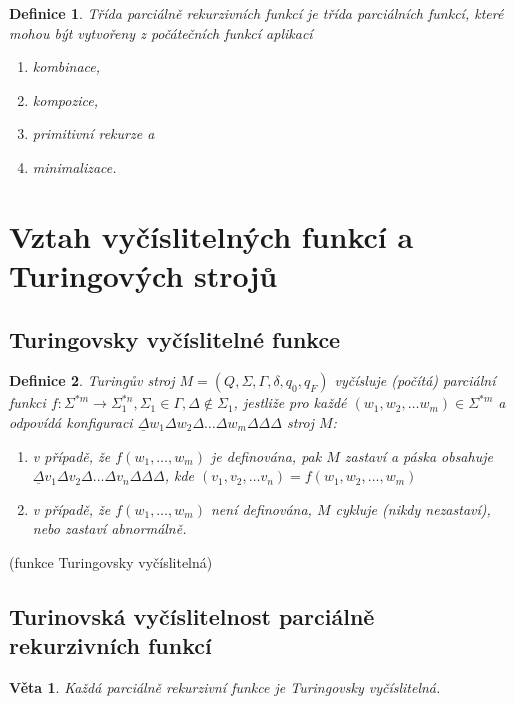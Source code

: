 \documentclass[a4paper, 11pt]{report}
\newtheorem{mydef}{Definice}[chapter]
\newtheorem{veta}{Věta}[chapter]
\begin{document}
\begin{mydef}
Třída parciálně rekurzivních funkcí je třída parciálních funkcí, které mohou být vytvořeny z počátečních funkcí aplikací
\begin{enumerate}
	\item kombinace,
	\item kompozice,
	\item primitivní rekurze a
	\item minimalizace.
\end{enumerate}
\end{mydef}

\section{Vztah vyčíslitelných funkcí a Turingových strojů}

\subsection{Turingovsky vyčíslitelné funkce}

\begin{mydef}
Turingův stroj $M=(Q, \Sigma, \Gamma, \delta, q_0, q_F)$ vyčísluje (počítá) parciální funkci $f: \Sigma^{*m} \to \Sigma_1^{*n}, \Sigma_1 \in \Gamma, \Delta \not\in \Sigma_1$, jestliže pro každé $(w_1, w_2, \dots w_m) \in \Sigma^{*m}$ a odpovídá konfiguraci $\underline{\Delta} w_1 \Delta w_2 \Delta \dots \Delta w_m \Delta \Delta \Delta$ stroj $M$:
\begin{enumerate}
	\item v případě, že $f(w_1, \dots, w_m)$ je definována, pak $M$ zastaví a páska obsahuje $\underline{\Delta} v_1 \Delta v_2 \Delta \dots \Delta v_n \Delta \Delta \Delta$, kde $(v_1, v_2, \dots v_n) = f(w_1, w_2, \dots, w_m)$
	\item v případě, že $f(w_1, \dots, w_m)$ není definována, $M$ cykluje (nikdy nezastaví), nebo zastaví abnormálně.
\end{enumerate}
\end{mydef}
(funkce Turingovsky vyčíslitelná)

\subsection{Turinovská vyčíslitelnost parciálně rekurzivních funkcí}

\begin{veta}
Každá parciálně rekurzivní funkce je Turingovsky vyčíslitelná.
\end{veta}
\end{document}
